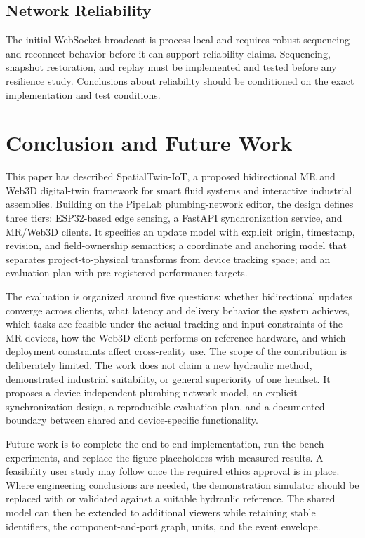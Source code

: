 \documentclass[conference]{IEEEtran}
\begin{document}
\subsection{Network Reliability}
The initial WebSocket broadcast is process-local and requires robust sequencing and reconnect behavior before it can support reliability claims. Sequencing, snapshot restoration, and replay must be implemented and tested before any resilience study. Conclusions about reliability should be conditioned on the exact implementation and test conditions.

\section{Conclusion and Future Work}
This paper has described SpatialTwin-IoT, a proposed bidirectional MR and Web3D digital-twin framework for smart fluid systems and interactive industrial assemblies. Building on the PipeLab plumbing-network editor, the design defines three tiers: ESP32-based edge sensing, a FastAPI synchronization service, and MR/Web3D clients. It specifies an update model with explicit origin, timestamp, revision, and field-ownership semantics; a coordinate and anchoring model that separates project-to-physical transforms from device tracking space; and an evaluation plan with pre-registered performance targets.

The evaluation is organized around five questions: whether bidirectional updates converge across clients, what latency and delivery behavior the system achieves, which tasks are feasible under the actual tracking and input constraints of the MR devices, how the Web3D client performs on reference hardware, and which deployment constraints affect cross-reality use. The scope of the contribution is deliberately limited. The work does not claim a new hydraulic method, demonstrated industrial suitability, or general superiority of one headset. It proposes a device-independent plumbing-network model, an explicit synchronization design, a reproducible evaluation plan, and a documented boundary between shared and device-specific functionality.

Future work is to complete the end-to-end implementation, run the bench experiments, and replace the figure placeholders with measured results. A feasibility user study may follow once the required ethics approval is in place. Where engineering conclusions are needed, the demonstration simulator should be replaced with or validated against a suitable hydraulic reference. The shared model can then be extended to additional viewers while retaining stable identifiers, the component-and-port graph, units, and the event envelope.
\end{document}
